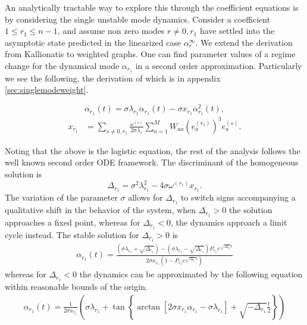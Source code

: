 \documentclass[%
 aip,
 amsmath,amssymb,
preprint,
reprint, onecolumn %
]{revtex4-1}
\begin{document}
An analytically tractable way to explore this through the coefficient equations is by considering the single unstable mode dynamics. 
Consider a coefficient $1\leq r_1\leq n-1$, and assume non zero modes $r\neq 0,r_1$ have settled into the asymptotic state predicted in the linearized case $\alpha_r^\infty$. We extend the derivation from Kallionatis\cite{kalloniatis_incoherence_2010} to weighted graphs. One can find parameter values of a regime change for the dynamical mode $\alpha_{r_1}$ in a second order approximation. Particularly we see the following, the derivation of which is in appendix \ref{sec:singlemodeweight}.

\begin{equation*}
    \dot{\alpha_{r_1}}(t) = \sigma\lambda_{r_1}\alpha_{r_1}(t) - \sigma x_{r_1} \alpha_{r_1}^2(t),
\end{equation*}
\begin{align*}
    x_{r_1} &= \sum_{s\neq 0,r_1} \frac{\omega^{(s)}}{2 \sigma \lambda_s}\sum_{a=1}^M W_{aa} (e_a^{(r_1)})^3e_a^{(s)}.
\end{align*}

Noting that the above is the logistic equation, the rest of the analysis follows the well known second order ODE framework. The discriminant of the homogeneous solution is
\begin{equation}\label{eqn:discrim}
    \Delta_{r_1}  = \sigma^2\lambda_{r_1}^2 - 4\sigma \omega^{(r_1)}x_{r_1}.
\end{equation}
The variation of the parameter $\sigma$ allows for $\Delta_{r_1}$ to switch signs accompanying a qualitative shift in the behavior of the system, when $\Delta_{r_1}>0$ the solution approaches a fixed point, whereas for $\Delta_{r_1}<0$, the dynamics approach a limit cycle instead. The stable solution for $\Delta_{r_1}>0$ is
\begin{align*}
    \alpha_{r_1}(t) = 
    \frac{(\sigma \lambda_{r_1} + \sqrt{\Delta_{r_1}}) - (\sigma\lambda_{r_1} - \sqrt{\Delta_{r_1}})P_{r_1}e^{\sqrt{\Delta_{r_1}}t}}{2\sigma x_{r_1} (1-P_{r_1}e^{\sqrt{\Delta_{r_1}}t})}
\end{align*}
whereas for $\Delta_{r_1}<0$ the dynamics can be approximated by the following equation within reasonable bounds of the origin.
\begin{align}\label{single_mode_approx}
    \alpha_{r_1}(t) = \frac{1}{2\sigma x_{r_1}}\left( \sigma\lambda_{r_1} + \tan\left\{ \arctan\left[ 2\sigma x_{r_1} \alpha_{r_1} - \sigma \lambda_{r_1}\right] + \sqrt{-\Delta_{r_1}}\frac{t}{2} \right\} \right)
\end{align}
\end{document}
